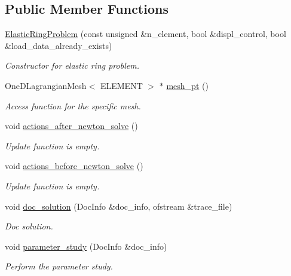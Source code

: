 \subsection*{Public Member Functions}
\begin{DoxyCompactItemize}
\item 
\hyperlink{classElasticRingProblem_a46779ff320754561750e22216f7605e3}{Elastic\+Ring\+Problem} (const unsigned \&n\+\_\+element, bool \&displ\+\_\+control, bool \&load\+\_\+data\+\_\+already\+\_\+exists)
\begin{DoxyCompactList}\small\item\em Constructor for elastic ring problem. \end{DoxyCompactList}\item 
One\+D\+Lagrangian\+Mesh$<$ E\+L\+E\+M\+E\+NT $>$ $\ast$ \hyperlink{classElasticRingProblem_a7e956ca937741ce71cf400eb492825b3}{mesh\+\_\+pt} ()
\begin{DoxyCompactList}\small\item\em Access function for the specific mesh. \end{DoxyCompactList}\item 
void \hyperlink{classElasticRingProblem_a58c2889fd4db8c17f4a4d964a5a7a90d}{actions\+\_\+after\+\_\+newton\+\_\+solve} ()
\begin{DoxyCompactList}\small\item\em Update function is empty. \end{DoxyCompactList}\item 
void \hyperlink{classElasticRingProblem_a6d084ac04c73a116f5ece449935a31d3}{actions\+\_\+before\+\_\+newton\+\_\+solve} ()
\begin{DoxyCompactList}\small\item\em Update function is empty. \end{DoxyCompactList}\item 
void \hyperlink{classElasticRingProblem_ab644c5fd57310f2d4c858f64d8c5a223}{doc\+\_\+solution} (Doc\+Info \&doc\+\_\+info, ofstream \&trace\+\_\+file)
\begin{DoxyCompactList}\small\item\em Doc solution. \end{DoxyCompactList}\item 
void \hyperlink{classElasticRingProblem_afed9c0948c535c315c3e22e92e3266d3}{parameter\+\_\+study} (Doc\+Info \&doc\+\_\+info)
\begin{DoxyCompactList}\small\item\em Perform the parameter study. \end{DoxyCompactList}\end{DoxyCompactItemize}
